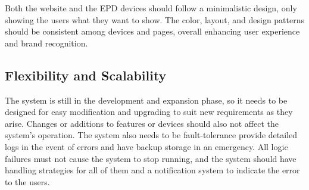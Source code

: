 \documentclass[../Main.tex]{subfiles}
\begin{document}
Both the website and the \gls{EPD} devices should follow a minimalistic design, only showing the users what they want to show. The color, layout, and design patterns should be consistent among devices and pages, overall enhancing user experience and brand recognition.

\subsection{Flexibility and Scalability}
The system is still in the development and expansion phase, so it needs to be designed for easy modification and upgrading to suit new requirements as they arise. Changes or additions to features or devices should also not affect the system's operation. The system also needs to be fault-tolerance provide detailed logs in the event of errors and have backup storage in an emergency. All logic failures must not cause the system to stop running, and the system should have handling strategies for all of them and a notification system to indicate the error to the users.
\end{document}
